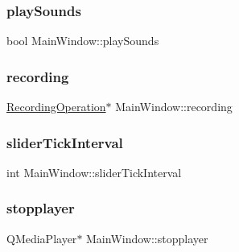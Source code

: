 \hypertarget{class_main_window_a034e18132b1729fa204f92305fb5e71f}{}\label{class_main_window_a034e18132b1729fa204f92305fb5e71f} 
\subsubsection{\texorpdfstring{play\+Sounds}{playSounds}}
{\footnotesize\ttfamily bool Main\+Window\+::play\+Sounds}

\hypertarget{class_main_window_ad5624c21fd77dfdb33d4a7320b6a4ab6}{}\label{class_main_window_ad5624c21fd77dfdb33d4a7320b6a4ab6} 
\subsubsection{\texorpdfstring{recording}{recording}}
{\footnotesize\ttfamily \hyperlink{class_recording_operation}{Recording\+Operation}$\ast$ Main\+Window\+::recording}

\hypertarget{class_main_window_a304d68be05ae4cd7086236120933ebcd}{}\label{class_main_window_a304d68be05ae4cd7086236120933ebcd} 
\subsubsection{\texorpdfstring{slider\+Tick\+Interval}{sliderTickInterval}}
{\footnotesize\ttfamily int Main\+Window\+::slider\+Tick\+Interval}

\hypertarget{class_main_window_a3c60004c5faa4c7a29b81eb2723d36b9}{}\label{class_main_window_a3c60004c5faa4c7a29b81eb2723d36b9} 
\subsubsection{\texorpdfstring{stopplayer}{stopplayer}}
{\footnotesize\ttfamily Q\+Media\+Player$\ast$ Main\+Window\+::stopplayer}

\hypertarget{class_main_window_a585bfd03f54d4e1f15109de662806090}{}\label{class_main_window_a585bfd03f54d4e1f15109de662806090} 

